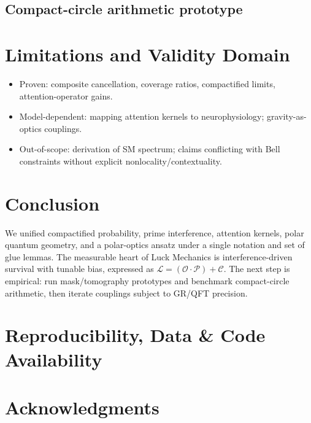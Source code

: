 \documentclass[12pt]{article}
\newcommand{\Luck}{\mathcal{L}}      %
\newcommand{\Opp}{\mathcal{O}}       %
\newcommand{\Prep}{\mathcal{P}}      %
\newcommand{\Circ}{\mathcal{C}}      %
\newcommand{\LuckFormula}{\Luck = (\Opp \cdot \Prep) + \Circ}
\theoremstyle{plain}
\theoremstyle{definition}
\theoremstyle{remark}
\begin{document}
\subsection{Compact-circle arithmetic prototype}

\section{Limitations and Validity Domain}
\begin{itemize}[leftmargin=1.1em]
  \item Proven: composite cancellation, coverage ratios, compactified limits, attention-operator gains.
  \item Model-dependent: mapping attention kernels to neurophysiology; gravity-as-optics couplings.
  \item Out-of-scope: derivation of SM spectrum; claims conflicting with Bell constraints without explicit nonlocality/contextuality.
\end{itemize}

\section{Conclusion}
We unified compactified probability, prime interference, attention kernels, polar quantum geometry, and a polar-optics ansatz under a single notation and set of glue lemmas. The measurable heart of Luck Mechanics is interference-driven survival with tunable bias, expressed as \(\LuckFormula\). The next step is empirical: run mask/tomography prototypes and benchmark compact-circle arithmetic, then iterate couplings subject to GR/QFT precision.

\section*{Reproducibility, Data \& Code Availability}

\section*{Acknowledgments}
\end{document}
